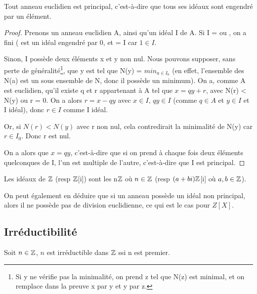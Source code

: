 \begin{proposition}
	Tout anneau euclidien est principal, c'est-à-dire que tous ses idéaux sont
	engendré par un élément.
\end{proposition}

\begin{proof}
	Prenons un anneau euclidien A, ainsi qu'un idéal I de A. Si I = 
	ou , on a fini ( est un idéal engendré par 0, et
	 = I car $1 \in I$.

	Sinon, I possède deux éléments x et y non nul. Nous pouvons supposer, sans
	perte de généralité\footnote{Si y ne vérifie pas la minimalité, on prend z
	tel que N(z) est minimal, et on remplace dans la preuve x par y et y par
z.}, que y est tel que N(y) = $\displaystyle min_{a \in I_{0}}$ (en
effet, l'ensemble des N(a) est un sous ensemble de N, donc il possède un
minimum).
	On a, comme A est euclidien, qu'il existe q et r appartenant à A tel que $x
	= qy + r$, avec N(r) < N(y) ou r = 0.
	On a alors $r = x - qy$ avec $x \in I$, $qy \in I$ (comme $q \in A$ et $y
	\in I$ et I idéal), donc $r \in I$ comme I idéal.
	
	Or, si $N(r) < N(y)$ avec r non nul, cela contredirait la minimalité de N(y)
	car $r \in I_{0}$. Donc r est nul.

	On a alors que $x = qy$, c'est-à-dire que si on prend à chaque fois deux
	éléments quelconques de I, l'un est multiple de l'autre, c'est-à-dire que
	I est principal.
\end{proof}

\begin{corollary}
	Les idéaux de $\mathbb{Z}$ (resp $\mathbb{Z}$[i]) sont les n$\mathbb{Z}$ où $n \in
	\mathbb{Z}$ (resp $(a+bi) \mathbb{Z}$[i] où $a, b \in \mathbb{Z}$).
\end{corollary}

On peut également en déduire que si un anneau possède un idéal non principal,
alors il ne possède pas de division euclidienne, ce qui est le cas pour $Z[X]$.


\subsection{Irréductibilité}

\begin{definition} 
	
\end{definition}

\begin{exemple}
	Soit $n \in \mathbb{Z}$, $n$ est irréductible dans $\mathbb{Z}$ ssi n est
	premier.
\end{exemple}

